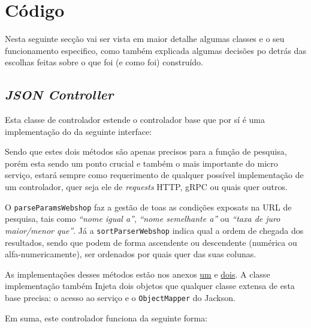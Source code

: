 \section{Código}

Nesta seguinte secção vai ser vista em maior detalhe algumas classes e o seu funcionamento especifico, como também explicada algumas decisões po detrás das escolhas feitas sobre o que foi (e como foi) construído.

\subsection{\textit{JSON Controller}}

Esta classe de controlador estende o controlador base que por sí é uma implementação do da seguinte interface:



Sendo que estes dois métodos são apenas precisos para a função de pesquisa, porém esta sendo um ponto crucial e também o mais importante do micro serviço, estará sempre como requerimento de qualquer possível implementação de um controlador, quer seja ele de \textit{requests} HTTP, gRPC ou quais quer outros.

O \texttt{parseParamsWebshop} faz a gestão de toas as condições exposats na URL de pesquisa, tais como \textit{``nome igual a''}, \textit{``nome semelhante a''} ou \textit{``taxa de juro maior/menor que''}. Já a \texttt{sortParserWebshop} indica qual a ordem de chegada dos resultados, sendo que podem de forma ascendente ou descendente (numérica ou alfa-numericamente), ser ordenados por quais quer das suas colunas.

As implementações desses métodos estão nos anexos \hyperref[an1]{um} e \hyperref[an2]{dois}. A classe implementação também Injeta dois objetos que qualquer classe extensa de esta base precisa: o acesso ao serviço e o \texttt{ObjectMapper} do Jackson.



Em suma, este controlador funciona da seguinte forma:

